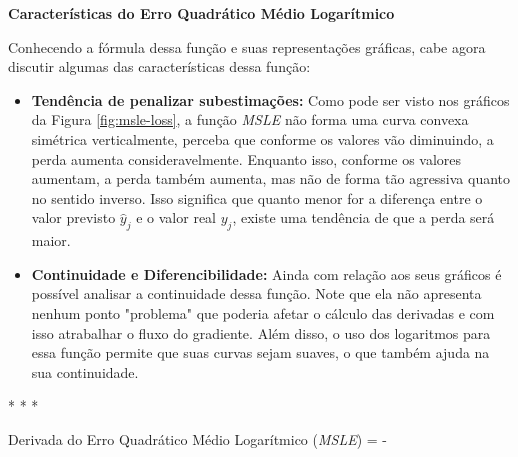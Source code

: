 \textbf{Características do Erro Quadrático Médio Logarítmico}
\vspace{1em}

Conhecendo a fórmula dessa função e suas representações gráficas, cabe agora discutir algumas das características dessa função:

\begin{itemize}
    \item \textbf{Tendência de penalizar subestimações:} Como pode ser visto nos gráficos da Figura \ref{fig:msle-loss}, a função \textit{MSLE} não forma uma curva convexa simétrica verticalmente, perceba que conforme os valores vão diminuindo, a perda aumenta consideravelmente. Enquanto isso, conforme os valores aumentam, a perda também aumenta, mas não de forma tão agressiva quanto no sentido inverso. Isso significa que quanto menor for a diferença entre o valor previsto $\hat{y}_j$ e o valor real $y_j$, existe uma tendência de que a perda será maior.
    \item \textbf{Continuidade e Diferencibilidade:} Ainda com relação aos seus gráficos é possível analisar a continuidade dessa função. Note que ela não apresenta nenhum ponto "problema" que poderia afetar o cálculo das derivadas e com isso atrabalhar o fluxo do gradiente. Além disso, o uso dos logaritmos para essa função permite que suas curvas sejam suaves, o que também ajuda na sua continuidade.
\end{itemize}

\medskip
\begin{center}
 * * *
\end{center}
\medskip

\begin{equacaodestaque}{Derivada do Erro Quadrático Médio Logarítmico (\textit{MSLE})}
     = -  \cdot {}
    \label{eq:msle-derivada}
\end{equacaodestaque}

